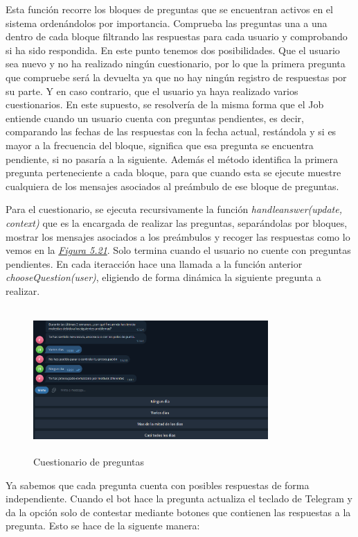 Esta función recorre los bloques de preguntas que se encuentran activos en el sistema ordenándolos por importancia. Comprueba las preguntas una a una dentro de cada bloque filtrando las respuestas para cada usuario y comprobando si ha sido respondida. En este punto tenemos dos posibilidades. Que el usuario sea nuevo y no ha realizado ningún cuestionario, por lo que la primera pregunta que compruebe será la devuelta ya que no hay ningún registro de respuestas por su parte. Y en caso contrario, que el usuario ya haya realizado varios cuestionarios. En este supuesto, se resolvería de la misma forma que el Job entiende cuando un usuario cuenta con preguntas pendientes, es decir, comparando las fechas de las respuestas con la fecha actual, restándola y si es mayor a la frecuencia del bloque, significa que esa pregunta se encuentra pendiente, si no pasaría a la siguiente. Además el método identifica la primera pregunta perteneciente a cada bloque, para que cuando esta se ejecute muestre cualquiera de los mensajes asociados al preámbulo de ese bloque de preguntas.

Para el cuestionario, se ejecuta recursivamente la función \textit{handleanswer(update, context)} que es la encargada de realizar las preguntas, separándolas por bloques, mostrar los mensajes asociados a los preámbulos y recoger las respuestas como lo vemos en la \textit{\hyperref[fig:cuestionario]{Figura 5.21}}. Solo termina cuando el usuario no cuente con preguntas pendientes. En cada iteracción hace una llamada a la función anterior \textit{chooseQuestion(user)}, eligiendo de forma dinámica la siguiente pregunta a realizar. 

\begin{figure}[!ht]
    \centering
    \includegraphics[width=0.8\textwidth, height=5.5cm]{imagenes/question.png}
    \caption{ Cuestionario de preguntas }
    \label{fig:cuestionario}
\end{figure}

Ya sabemos que cada pregunta cuenta con posibles respuestas de forma independiente. Cuando el bot hace la pregunta actualiza el teclado de Telegram y da la opción solo de contestar mediante botones que contienen las respuestas a la pregunta. Esto se hace de la siguente manera:

